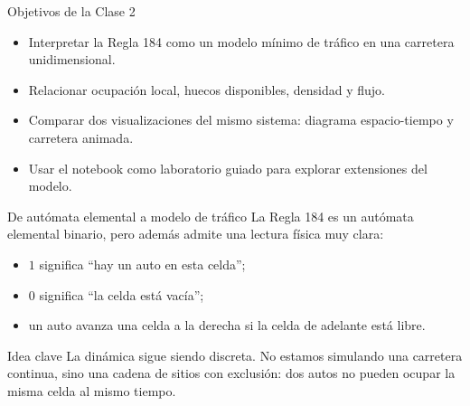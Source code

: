 \begin{frame}{Objetivos de la Clase 2}
\begin{itemize}
    \item Interpretar la Regla 184 como un modelo mínimo de tráfico en una carretera unidimensional.
    \item Relacionar ocupación local, huecos disponibles, densidad y flujo.
    \item Comparar dos visualizaciones del mismo sistema: diagrama espacio-tiempo y carretera animada.
    \item Usar el notebook como laboratorio guiado para explorar extensiones del modelo.
\end{itemize}
\end{frame}

\begin{frame}{De autómata elemental a modelo de tráfico}
\justifying
La Regla 184 es un autómata elemental binario, pero además admite una lectura física muy clara:

\begin{itemize}
    \item $1$ significa ``hay un auto en esta celda'';
    \item $0$ significa ``la celda está vacía'';
    \item un auto avanza una celda a la derecha si la celda de adelante está libre.
\end{itemize}

\begin{alertblock}{Idea clave}
La dinámica sigue siendo discreta. No estamos simulando una carretera continua, sino una cadena de sitios con exclusión: dos autos no pueden ocupar la misma celda al mismo tiempo.
\end{alertblock}
\end{frame}

